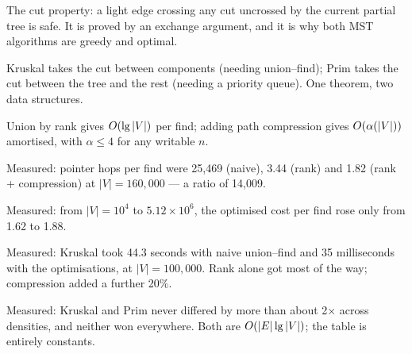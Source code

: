\begin{chaptersummary}
\begin{tight}
  \item The cut property: a light edge crossing any cut uncrossed by the
        current partial tree is safe. It is proved by an exchange argument, and
        it is why both MST algorithms are greedy and optimal.
  \item Kruskal takes the cut between components (needing union--find); Prim
        takes the cut between the tree and the rest (needing a priority queue).
        One theorem, two data structures.
  \item Union by rank gives $O(\operatorname{lg}|V|)$ per find; adding path compression
        gives $O(\alpha(|V|))$ amortised, with $\alpha \le 4$ for any
        writable $n$.
  \item Measured: pointer hops per find were 25{,}469 (naive), 3.44 (rank) and
        1.82 (rank + compression) at $|V| = 160{,}000$ --- a ratio of 14{,}009.
  \item Measured: from $|V| = 10^{4}$ to $5.12\times10^{6}$, the optimised cost
        per find rose only from 1.62 to 1.88.
  \item Measured: Kruskal took 44.3 seconds with naive union--find and 35
        milliseconds with the optimisations, at $|V| = 100{,}000$. Rank alone
        got most of the way; compression added a further 20\%.
  \item Measured: Kruskal and Prim never differed by more than about 2$\times$
        across densities, and neither won everywhere. Both are
        $O(|E|\operatorname{lg}|V|)$; the table is entirely constants.
\end{tight}
\end{chaptersummary}

